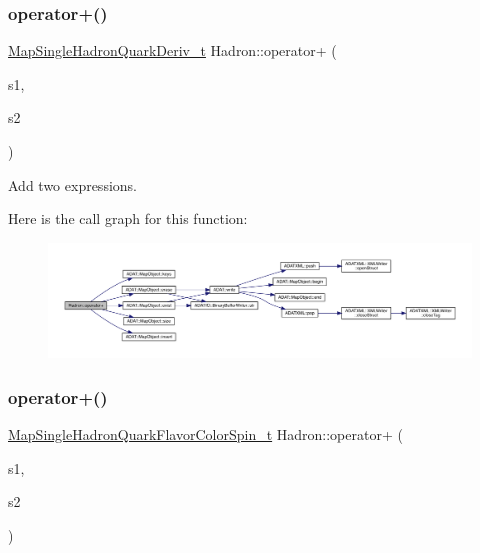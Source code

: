 \subsubsection{\texorpdfstring{operator+()}{operator+()}\hspace{0.1cm}{\footnotesize\ttfamily [2/3]}}
{\footnotesize\ttfamily \mbox{\hyperlink{namespaceHadron_aa588220689caea8a6aad4d0296526e6b}{Map\+Single\+Hadron\+Quark\+Deriv\+\_\+t}} Hadron\+::operator+ (\begin{DoxyParamCaption}\item[{const \mbox{\hyperlink{namespaceHadron_aa588220689caea8a6aad4d0296526e6b}{Map\+Single\+Hadron\+Quark\+Deriv\+\_\+t}} \&}]{s1,  }\item[{const \mbox{\hyperlink{namespaceHadron_aa588220689caea8a6aad4d0296526e6b}{Map\+Single\+Hadron\+Quark\+Deriv\+\_\+t}} \&}]{s2 }\end{DoxyParamCaption})}



Add two expressions. 

Here is the call graph for this function\+:\nopagebreak
\begin{figure}[H]
\begin{center}
\leavevmode
\includegraphics[width=350pt]{d1/daf/namespaceHadron_afa83538fb097946f87e6f98180c378b5_cgraph}
\end{center}
\end{figure}
\mbox{\label{namespaceHadron_a168571d9c710321169dad756440c1952}} 
\subsubsection{\texorpdfstring{operator+()}{operator+()}\hspace{0.1cm}{\footnotesize\ttfamily [3/3]}}
{\footnotesize\ttfamily \mbox{\hyperlink{namespaceHadron_a03b319764f85c20434f20a269ce5f388}{Map\+Single\+Hadron\+Quark\+Flavor\+Color\+Spin\+\_\+t}} Hadron\+::operator+ (\begin{DoxyParamCaption}\item[{const \mbox{\hyperlink{namespaceHadron_a03b319764f85c20434f20a269ce5f388}{Map\+Single\+Hadron\+Quark\+Flavor\+Color\+Spin\+\_\+t}} \&}]{s1,  }\item[{const \mbox{\hyperlink{namespaceHadron_a03b319764f85c20434f20a269ce5f388}{Map\+Single\+Hadron\+Quark\+Flavor\+Color\+Spin\+\_\+t}} \&}]{s2 }\end{DoxyParamCaption})}



